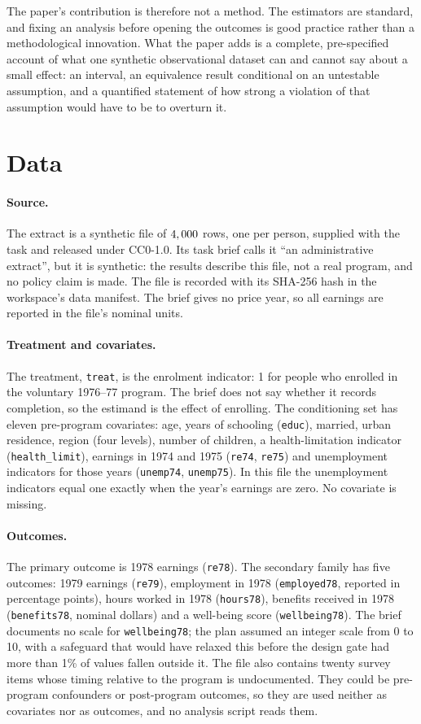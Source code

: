 \documentclass[11pt]{article}
\newcommand{\var}[1]{\texttt{#1}}
\begin{document}
The paper's contribution is therefore not a method. The estimators are standard, and fixing
an analysis before opening the outcomes is good practice rather than a methodological
innovation. What the paper adds is a complete, pre-specified account of what one synthetic
observational dataset can and cannot say about a small effect: an interval, an equivalence
result conditional on an untestable assumption, and a quantified statement of how strong a
violation of that assumption would have to be to overturn it.

\section{Data}
\label{sec:data}

\paragraph{Source.} The extract is a synthetic file of $4,000$ rows, one per person,
supplied with the task and released under CC0-1.0. Its task brief calls it ``an
administrative extract'', but it is synthetic: the results describe this file, not a real
program, and no policy claim is made. The file is recorded with its SHA-256 hash in the
workspace's data manifest. The brief gives no price year, so all earnings are reported in
the file's nominal units.

\paragraph{Treatment and covariates.} The treatment, \var{treat}, is the enrolment
indicator: 1 for people who enrolled in the voluntary 1976--77 program. The brief does not
say whether it records completion, so the estimand is the effect of enrolling. The
conditioning set has eleven pre-program covariates: age, years of schooling (\var{educ}),
married, urban residence, region (four levels), number of children, a health-limitation
indicator (\var{health\_limit}), earnings in 1974 and 1975 (\var{re74}, \var{re75}) and
unemployment indicators for those years (\var{unemp74}, \var{unemp75}). In this file the
unemployment indicators equal one exactly when the year's earnings are zero. No covariate is
missing.

\paragraph{Outcomes.} The primary outcome is 1978 earnings (\var{re78}). The secondary
family has five outcomes: 1979 earnings (\var{re79}), employment in 1978
(\var{employed78}, reported in percentage points), hours worked in 1978 (\var{hours78}),
benefits received in 1978 (\var{benefits78}, nominal dollars) and a well-being score
(\var{wellbeing78}). The brief documents no scale for \var{wellbeing78}; the plan assumed an
integer scale from 0 to 10, with a safeguard that would have relaxed this before the design
gate had more than 1\% of values fallen outside it. The file also contains twenty survey
items whose timing relative to the program is undocumented. They could be pre-program
confounders or post-program outcomes, so they are used neither as covariates nor as
outcomes, and no analysis script reads them.
\end{document}
